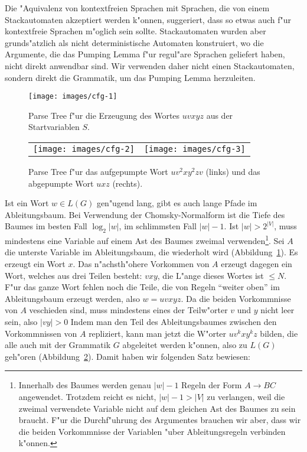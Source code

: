 Die "Aquivalenz von kontextfreien Sprachen mit Sprachen, die von einem
Stackautomaten akzeptiert werden k"onnen, suggeriert, dass so etwas
auch f"ur kontextfreie Sprachen m"oglich sein sollte. Stackautomaten
wurden aber grunds"atzlich als nicht deterministische Automaten
konstruiert, wo die Argumente, die das Pumping Lemma f"ur regul"are
Sprachen geliefert haben, nicht direkt anwendbar sind. Wir verwenden
daher nicht einen Stackautomaten, sondern direkt die Grammatik, um
das Pumping Lemma herzuleiten.

\begin{figure}
\begin{center}
\texttt{[image: images/cfg-1]}
\end{center}
\caption{Parse Tree f"ur die Erzeugung des Wortes $uvxyz$ aus der
Startvariablen $S$.\label{cfg-tree-1}}
\end{figure}
\begin{figure}
\begin{center}
\begin{tabular}{cc}
\texttt{[image: images/cfg-2]}&%
\texttt{[image: images/cfg-3]}\\
\end{tabular}
\end{center}
\caption{Parse Tree f"ur das aufgepumpte Wort $uv^2xy^2zv$ (links) und das
abgepumpte Wort $uxz$ (rechts).\label{cfg-tree-2}}
\end{figure}

Ist ein Wort $w\in L(G)$ gen"ugend lang, gibt es auch lange Pfade im
Ableitungsbaum. Bei Verwendung der Chomsky-Normalform ist die 
Tiefe des Baumes im besten Fall $\log_2 |w|$, im schlimmsten Fall $|w|-1$.
Ist $|w|>2^{|V|}$, muss mindestens eine
Variable auf einem Ast des Baumes zweimal verwenden\footnote{
Innerhalb des Baumes werden genau $|w|-1$ Regeln der
Form $A\to BC$ angewendet.
Trotzdem reicht es nicht, $|w|-1>|V|$ zu verlangen, weil die
zweimal verwendete Variable nicht auf dem gleichen Ast des
Baumes zu sein braucht. F"ur die Durchf"uhrung des Argumentes
brauchen wir aber, dass wir die beiden Vorkommnisse der Variablen
"uber Ableitungsregeln verbinden k"onnen.}.
Sei $A$ die unterste Variable im Ableitungsbaum, die wiederholt
wird (Abbildung~\ref{cfg-tree-1}).
Es erzeugt ein Wort $x$. Das n"achsth"ohere Vorkommen von $A$
erzeugt dagegen ein Wort, welches aus drei Teilen besteht:
$vxy$, die L"ange dieses Wortes ist $\le N$. F"ur das ganze Wort fehlen
noch die Teile, die von Regeln ``weiter oben'' im Ableitungsbaum
erzeugt werden, also $w=uvxyz$.
Da die beiden Vorkommnisse von $A$ veschieden sind, muss mindestens
eines der Teilw"orter $v$ und $y$ nicht leer sein, also $|vy|>0$
Indem man den Teil des Ableitungsbaumes
zwischen den Vorkommnissen von $A$ repliziert, kann man jetzt die
W"orter $uv^kxy^kz$ bilden, die alle auch mit der Grammatik $G$ 
abgeleitet werden k"onnen, also zu $L(G)$ geh"oren (Abbildung~\ref{cfg-tree-2}).
Damit haben wir folgenden Satz bewiesen:

